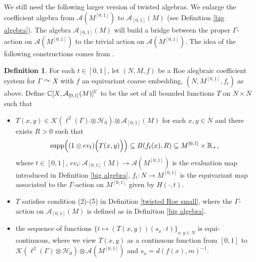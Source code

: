 \documentclass[11pt]{article}
\theoremstyle{definition}
\newtheorem{Def}{Definition}[section]
\theoremstyle{plain}
\def\A{\mathcal A}\def\C{\mathcal C}\def\B{\mathcal B}\def\E{\mathcal E}\def\O{\mathcal O}\def\h{\mathfrak h}\def\K{\mathcal K}\def\F{\mathcal F}\def\P{\mathcal P}\def\L{\mathcal L}\def\R{\mathcal R}\def\Q{\mathcal Q}\def\H{\mathcal H}\def\S{\mathcal S}\def\N{\mathcal N}\def\U{\mathcal U}\def\V{\mathcal V}
\def\supp{\textup{supp}}
\def\ox{\otimes}
\def\ox{\otimes}
\def\Ga{\Gamma}
\def\car{\curvearrowright}
\begin{document}
We still need the following larger version of twisted algebras. We enlarge the coefficient algebra from $\A(M^{[0,1]})$ to $\A_{[0,1]}(M)$ (see Definition \ref{big algebra}). The algebra $\A_{[0,1]}(M)$ will build a bridge between the proper $\Ga$-action on $\A(M^{[0,1]})$ to the trivial action on $\A(M^{[0,1]})$. The idea of the following constructions comes from \cite[Lemma 8.3]{GWY2018}.





































\begin{Def}\label{twist Roe big}
For each $t\in[0,1]$, let $(N,M,f)$ be a Roe alegbraic coefficient system for $\Ga\car X$ with $f$ an equivariant coarse embedding,  $(N,M^{[0,1]},f_t)$ as above. Define $\IC[X,\A_{[0,1]}(M)]^{\Ga}$ to be the set of all bounded functions $T$ on $N\times N$ such that\begin{itemize}
\item[(1)] $T(x,y)\in\K(\ell^2(\Ga)\ox\H_0)\ox\A_{[0,1]}(M)$ for each $x,y\in N$ and there exists $R>0$ such that
$$\supp\Big((1\ox ev_t)\Big(T(x,y)\Big)\Big)\subseteq B(f_t(x),R)\subseteq M^{[0,1]}\times\IR_+,$$
where $t\in[0,1]$, $ev_t:\A_{[0,1]}(M)\to\A(M^{[0,1]})$ is the evaluation map introduced in Definition \ref{big algebra}, $f_t:N\to M^{[0,1]}$ is the equivariant map associated to the $\Ga$-action on $M^{[0,1]}$ given by $H(\cdot,t)$.
\item[(2)] $T$ satisfies condition (2)-(5) in Definition \ref{twisted Roe small}, where the $\Ga$-action on $\A_{[0,1]}(M)$ is defined as in Definition \ref{big algebra}.
\item[(3)] the sequence of functions $\{t\mapsto(T(x,y))(s_x\cdot t)\}_{x,y\in N}$ is equi-continuous, where we view $T(x,y)$ as a continuous function from $[0,1]$ to $\K(\ell^2(\Ga)\ox\H_0)\ox\A(M^{[0,1]})$ and $s_x=d(f(x),m)^{-1}$.
\end{itemize}\end{Def}
\end{document}
